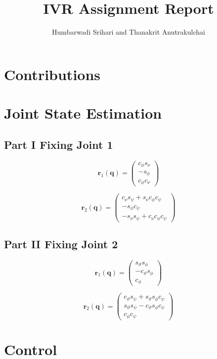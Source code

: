 \documentclass[11pt, a4paper]{article}
\title{IVR Assignment Report}
\author{Humbarwadi Srihari and Thanakrit Anutrakulchai}
\begin{document}
    \maketitle
    \section{Contributions}
    \section{Joint State Estimation}
    \subsection{Part I \textemdash Fixing Joint 1}
    $$
    \textbf{r}_1(\textbf{q}) =
    \begin{pmatrix}
        c_{\phi}s_{\nu}\\
       -s_{\phi}\\
        c_{\phi}c_{\nu}
    \end{pmatrix} 
    $$
    
    $$
    \textbf{r}_2(\textbf{q}) =
    \begin{pmatrix}
        c_{\nu}s_{\psi} + s_{\nu}c_{\phi}c_{\psi}\\
       -s_{\phi}c_{\psi}\\
       -s_{\nu}s_{\psi} + c_{\nu}c_{\phi}c_{\psi}
    \end{pmatrix} 
    $$

    \subsection{Part II \textemdash Fixing Joint 2}
    $$
    \textbf{r}_1(\textbf{q}) =
    \begin{pmatrix}
        s_{\vartheta}s_{\phi}\\
       -c_{\vartheta}s_{\phi}\\
        c_{\phi}
    \end{pmatrix} 
    $$

    $$
    \textbf{r}_2(\textbf{q}) =
    \begin{pmatrix}
        c_{\vartheta}s_{\psi} + s_{\vartheta}s_{\phi}c_{\psi}\\
        s_{\vartheta}s_{\psi} - c_{\vartheta}s_{\phi}c_{\psi}\\
        c_{\phi}c_{\psi}
    \end{pmatrix}
    $$

    \section{Control}
\end{document}
